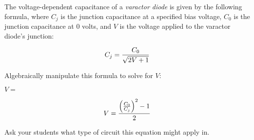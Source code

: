 

The voltage-dependent capacitance of a {\it varactor diode} is given by the following formula, where $C_j$ is the junction capacitance at a specified bias voltage, $C_0$ is the junction capacitance at 0 volts, and $V$ is the voltage applied to the varactor diode's junction:

$$C_j = {C_0 \over {\sqrt{2V + 1}}}$$

Algebraically manipulate this formula to solve for $V$:

\vskip 20pt

$V = $








$$V = {\left(C_0 \over C_j \right)^2 - 1 \over 2}$$







Ask your students what type of circuit this equation might apply in.





